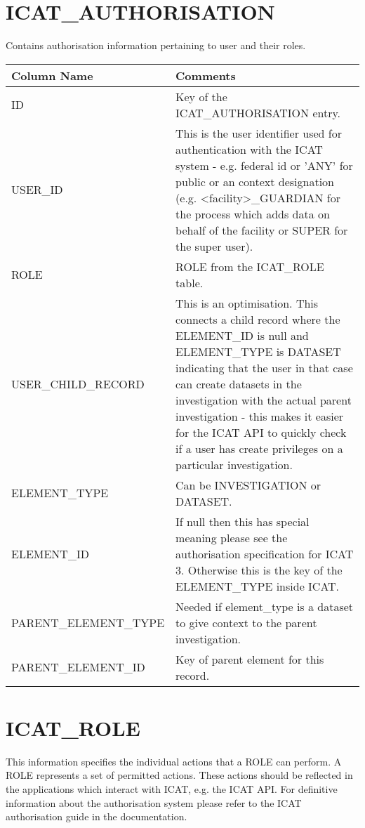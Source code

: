 \documentclass{report}
\begin{document}
\section{ICAT\_AUTHORISATION}

Contains authorisation information pertaining to user and their roles.\\

\begin{tabular}{|l|l|}
\hline
Column Name & Comments \\ \hline
ID & \multicolumn{1}{p{100mm}|}{
Key of the ICAT\_AUTHORISATION entry.} \\ \hline
USER\_ID & \multicolumn{1}{p{100mm}|}{
This is the user identifier used for authentication with the ICAT system - e.g. federal id or 'ANY' for public or an context designation (e.g. \textless{}facility\textgreater{}\_GUARDIAN for the process which adds data on behalf of the facility or SUPER for the super user).} \\ \hline
ROLE & \multicolumn{1}{p{100mm}|}{
ROLE from the ICAT\_ROLE table.} \\ \hline
USER\_CHILD\_RECORD & \multicolumn{1}{p{100mm}|}{
This is an optimisation. This connects a child record where the ELEMENT\_ID is null and ELEMENT\_TYPE is DATASET indicating that the user in that case can create datasets in the investigation with the actual parent investigation - this makes it easier for the ICAT API to quickly check if a user has create privileges on a particular investigation.} \\ \hline
ELEMENT\_TYPE & \multicolumn{1}{p{100mm}|}{
Can be INVESTIGATION or DATASET.} \\ \hline
ELEMENT\_ID & \multicolumn{1}{p{100mm}|}{
If null then this has special meaning please see the authorisation specification for ICAT 3. Otherwise this is the key of the ELEMENT\_TYPE inside ICAT.} \\ \hline
PARENT\_ELEMENT\_TYPE & \multicolumn{1}{p{100mm}|}{
Needed if element\_type is a dataset to give context to the parent investigation.} \\ \hline
PARENT\_ELEMENT\_ID & \multicolumn{1}{p{100mm}|}{
Key of parent element for this record.} \\ \hline
\end{tabular}
\section{ICAT\_ROLE}

This information specifies the individual actions that a ROLE can perform. A ROLE represents a set of permitted actions. These actions should be reflected in the applications which interact with ICAT, e.g. the ICAT API. For definitive information about the authorisation system please refer to the ICAT authorisation guide in the documentation.\\
\end{document}

